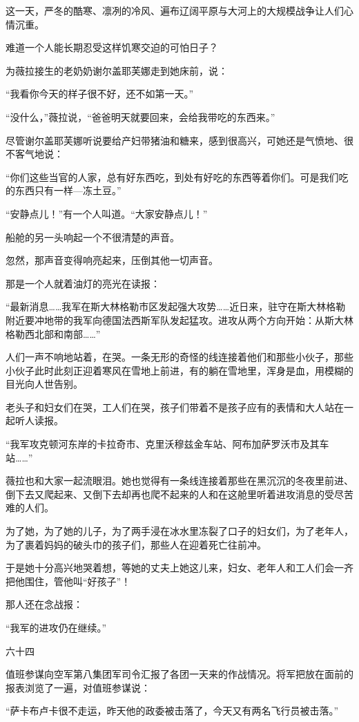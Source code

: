 这一天，严冬的酷寒、凛冽的冷风、遍布辽阔平原与大河上的大规模战争让人们心情沉重。

难道一个人能长期忍受这样饥寒交迫的可怕日子？

为薇拉接生的老奶奶谢尔盖耶芙娜走到她床前，说：

“我看你今天的样子很不好，还不如第一天。”

“没什么，”薇拉说，“爸爸明天就要回来，会给我带吃的东西来。”

尽管谢尔盖耶芙娜听说要给产妇带猪油和糖来，感到很高兴，可她还是气愤地、很不客气地说：

“你们这些当官的人家，总有好东西吃，到处有好吃的东西等着你们。可是我们吃的东西只有一样—冻土豆。”

“安静点儿！”有一个人叫道。“大家安静点儿！”

船舱的另一头响起一个不很清楚的声音。

忽然，那声音变得响亮起来，压倒其他一切声音。

那是一个人就着油灯的亮光在读报：

“最新消息……我军在斯大林格勒市区发起强大攻势……近日来，驻守在斯大林格勒附近要冲地带的我军向德国法西斯军队发起猛攻。进攻从两个方向开始：从斯大林格勒西北部和南部……”

人们一声不响地站着，在哭。一条无形的奇怪的线连接着他们和那些小伙子，那些小伙子此时此刻正迎着寒风在雪地上前进，有的躺在雪地里，浑身是血，用模糊的目光向人世告别。

老头子和妇女们在哭，工人们在哭，孩子们带着不是孩子应有的表情和大人站在一起听人读报。

“我军攻克顿河东岸的卡拉奇市、克里沃穆兹金车站、阿布加萨罗沃市及其车站……”

薇拉也和大家一起流眼泪。她也觉得有一条线连接着那些在黑沉沉的冬夜里前进、倒下去又爬起来、又倒下去却再也爬不起来的人和在这舱里听着进攻消息的受尽苦难的人们。

为了她，为了她的儿子，为了两手浸在冰水里冻裂了口子的妇女们，为了老年人，为了裹着妈妈的破头巾的孩子们，那些人在迎着死亡往前冲。

于是她十分高兴地哭着想，等她的丈夫上她这儿来，妇女、老年人和工人们会一齐把他围住，管他叫“好孩子”！

那人还在念战报：

“我军的进攻仍在继续。”

六十四

值班参谋向空军第八集团军司令汇报了各团一天来的作战情况。将军把放在面前的报表浏览了一遍，对值班参谋说：

“萨卡布卢卡很不走运，昨天他的政委被击落了，今天又有两名飞行员被击落。”

